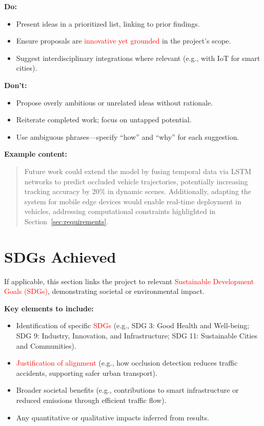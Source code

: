 \documentclass[12pt,a4paper]{report}
\theoremstyle{definition}
\theoremstyle{remark}
\begin{document}
\noindent \textbf{Do:}
\begin{itemize}
    \item Present ideas in a prioritized list, linking to prior findings.
    \item Ensure proposals are \textcolor{red}{innovative yet grounded} in the project's scope.
    \item Suggest interdisciplinary integrations where relevant (e.g., with IoT for smart cities).
\end{itemize}

\noindent \textbf{Don’t:}
\begin{itemize}
    \item Propose overly ambitious or unrelated ideas without rationale.
    \item Reiterate completed work; focus on untapped potential.
    \item Use ambiguous phrases—specify ``how'' and ``why'' for each suggestion.
\end{itemize}

\noindent \textbf{Example content:}
\begin{quote}
    Future work could extend the model by fusing temporal data via LSTM networks to predict occluded vehicle trajectories, potentially increasing tracking accuracy by 20\% in dynamic scenes. Additionally, adapting the system for mobile edge devices would enable real-time deployment in vehicles, addressing computational constraints highlighted in Section~\ref{sec:requirements}.
\end{quote}

\section{SDGs Achieved}
\label{sec:sdgs-achieved}

If applicable, this section links the project to relevant \textcolor{red}{Sustainable Development Goals (SDGs)}, demonstrating societal or environmental impact.

\noindent \textbf{Key elements to include:}
\begin{itemize}
    \item Identification of specific \textcolor{red}{SDGs} (e.g., SDG 3: Good Health and Well-being; SDG 9: Industry, Innovation, and Infrastructure; SDG 11: Sustainable Cities and Communities).
    \item \textcolor{red}{Justification of alignment} (e.g., how occlusion detection reduces traffic accidents, supporting safer urban transport).
    \item Broader societal benefits (e.g., contributions to smart infrastructure or reduced emissions through efficient traffic flow).
    \item Any quantitative or qualitative impacts inferred from results.
\end{itemize}
\end{document}
